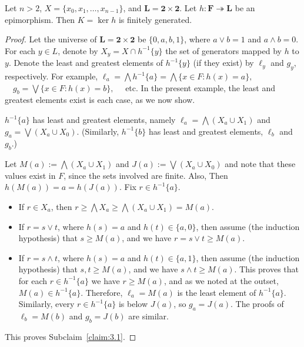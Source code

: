 \begin{prop}\label{prop:3} 
Let $n > 2$, $X = \{x_0, x_1,\dots, x_{n-1}\}$, and $\mathbf{L} = \mathbf{2} \times \mathbf{2}$.  
Let $h\colon \mathbf{F} \twoheadrightarrow \mathbf{L}$ be an epimorphism. 
Then $K = \operatorname{ker}h$ is finitely generated.  
\end{prop}
\begin{proof} 
Let the universe of $\mathbf{L} = \mathbf{2} \times \mathbf{2}$ be $\{0, a, b, 1\}$, 
where $a\vee b = 1$ and $a\wedge b = 0$. For each $y \in L$, denote by 
$X_y = X \cap h^{-1}\{y\}$ the set of generators mapped by $h$ to $y$. 
Denote the least and greatest elements of $h^{-1}\{y\}$ (if they exist) by $\ell_y$ 
and $g_y$, respectively.  For example, 
$\ell_a = \bigwedge h^{-1}\{a\} = \bigwedge \{x\in F: h(x) = a\},\;$ 
$\quad g_b = \bigvee \{x\in F : h(x) = b\},\quad$ etc. 
In the present example, the least and greatest elements exist is each case, as we now show.

\begin{subclaim}\label{claim:3.1}
  $h^{-1}\{a\}$ has least and greatest elements, namely 
  $\ell_a = \bigwedge (X_a \cup X_1)$ and $g_a = \bigvee (X_a\cup X_0)$.  
  (Similarly, $h^{-1}\{b\}$ has least and greatest elements, $\ell_b$ and $g_b$.)
\end{subclaim}
Let $M(a):=\bigwedge (X_a\cup X_1)$ and $J(a):=\bigvee (X_a\cup X_0)$ and 
note that these values exist in $F$, since the sets involved are finite. Also, 
Then $h(M(a)) = a = h(J(a))$. Fix $r \in h^{-1}\{a\}$.  
\begin{itemize}
\item If $r \in X_a$, then $r\geqslant \bigwedge X_a \geqslant \bigwedge (X_a\cup X_1) = M(a)$.

\item If $r = s \vee t$, where $h(s) = a$ and $h(t) \in \{a, 0\}$, then    
assume (the induction hypothesis) that $s \geqslant M(a)$, and we have
$r = s\vee t \geqslant M(a)$.

\item If $r = s \wedge t$, where $h(s) = a$ and $h(t) \in \{a, 1\}$, then 
assume (the induction hypothesis) that $s, t \geqslant M(a)$, and we have 
$s \wedge t \geqslant M(a)$.
This proves that for each $r \in h^{-1}\{a\}$ we have $r \geqslant M(a)$, and 
as we noted at the outset, $M(a)\in h^{-1}\{a\}$. Therefore, $\ell_a = M(a)$ is 
the least element of $h^{-1}\{a\}$. Similarly, every $r \in h^{-1}\{a\}$ is 
below $J(a)$, so $g_a = J(a)$.  The proofs of $\ell_b = M(b)$ and $g_b = J(b)$ 
are similar.
\end{itemize}
This proves Subclaim~\ref{claim:3.1}.



\end{proof}

